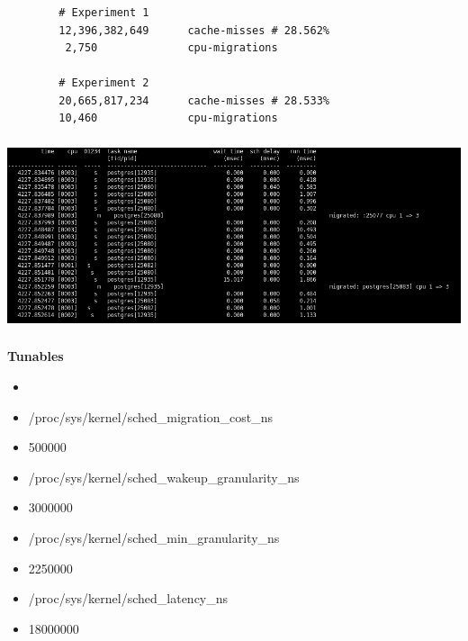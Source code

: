 \documentclass[usenames,dvipsnames, 18pt, compress, aspectratio=169]{beamer}
\begin{document}
\begin{frame}[fragile]{}
    \frametitle{}
    \begin{center}

        \begin{verbatim}
        # Experiment 1
        12,396,382,649      cache-misses # 28.562%
         2,750              cpu-migrations

        # Experiment 2
        20,665,817,234      cache-misses # 28.533%
        10,460              cpu-migrations
        \end{verbatim}

    \end{center}
\end{frame}

\begin{frame}
    \frametitle{}
    \begin{center}

        \includegraphics[width=1.0\textwidth,center]{migrations.png}

    \end{center}
\end{frame}

\begin{frame}
    \frametitle{}
    \begin{center}
    \textbf{Tunables}

        \begin{itemize}
            \item <+->
        \end{itemize}

        \begin{itemize}[label={\MVRightarrow}]
            \item <+-> /proc/sys/kernel/sched\_migration\_cost\_ns
            \item <+-> 500000
            \item <+-> /proc/sys/kernel/sched\_wakeup\_granularity\_ns
            \item <+-> 3000000
            \item <+-> /proc/sys/kernel/sched\_min\_granularity\_ns
            \item <+-> 2250000
            \item <+-> /proc/sys/kernel/sched\_latency\_ns
            \item <+-> 18000000
        \end{itemize}

    \end{center}
\end{frame}
\end{document}
